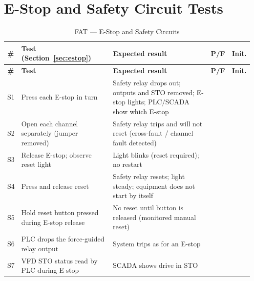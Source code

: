 \section{E-Stop and Safety Circuit Tests}
\begin{small}
\begin{longtable}{@{}|P{0.76cm}|P{6.40cm}|P{6.28cm}|P{0.98cm}|P{1.14cm}|@{}}
\caption{FAT --- E-Stop and Safety Circuits}\label{tab:fat-estop} \\
\hline
{}\textbf{\#} & \textbf{Test (Section~\ref{sec:estop})} & \textbf{Expected result} & \textbf{P/F} & \textbf{Init.} \\ \hline
\endfirsthead
\hline
{}\textbf{\#} & \textbf{Test} & \textbf{Expected result} & \textbf{P/F} & \textbf{Init.} \\ \hline
\endhead
S1 & Press each E-stop in turn & Safety relay drops out; outputs and STO removed; E-stop lights; PLC/SCADA show which E-stop & & \\ \hline
S2 & Open each channel separately (jumper removed) & Safety relay trips and will not reset (cross-fault / channel fault detected) & & \\ \hline
S3 & Release E-stop; observe reset light & Light blinks (reset required); no restart & & \\ \hline
S4 & Press and release reset & Safety relay resets; light steady; equipment does not start by itself & & \\ \hline
S5 & Hold reset button pressed during E-stop release & No reset until button is released (monitored manual reset) & & \\ \hline
S6 & PLC drops the force-guided relay output & System trips as for an E-stop & & \\ \hline
S7 & VFD STO status read by PLC during E-stop & SCADA shows drive in STO & & \\ \hline
\end{longtable}
\end{small}

